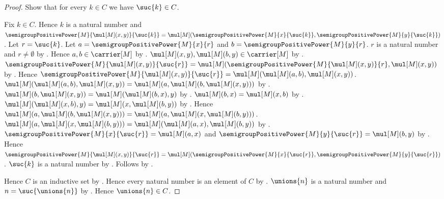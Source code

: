 \begin{proof}
    Show that for every $k\in C$ we have $\suc{k}\in C$.
    \begin{subproof}
        Fix $k\in C$.
        Hence $k$ is a natural number and
            $\semigroupPositivePower{M}{\mul[M](x,y)}{\suc{k}}
                =\mul[M](\semigroupPositivePower{M}{x}{\suc{k}},
                    \semigroupPositivePower{M}{y}{\suc{k}})$.
        Let $r=\suc{k}$.
        Let $a=\semigroupPositivePower{M}{x}{r}$ and
            $b=\semigroupPositivePower{M}{y}{r}$.
        $r$ is a natural number and $r\neq\emptyset$ by
            .
        Hence $a,b\in\carrier[M]$ by
            .
        $\mul[M](x,y),\mul[M](b,y)\in\carrier[M]$ by
            .
        $\semigroupPositivePower{M}{\mul[M](x,y)}{\suc{r}}
            =\mul[M](
                \semigroupPositivePower{M}{\mul[M](x,y)}{r},
                \mul[M](x,y))$ by
            .
        Hence $\semigroupPositivePower{M}{\mul[M](x,y)}{\suc{r}}
            =\mul[M](\mul[M](a,b),\mul[M](x,y))$.
        $\mul[M](\mul[M](a,b),\mul[M](x,y))
            =\mul[M](a,\mul[M](b,\mul[M](x,y)))$ by
            .
        $\mul[M](b,\mul[M](x,y))
            =\mul[M](\mul[M](b,x),y)$ by
            .
        $\mul[M](b,x)=\mul[M](x,b)$ by \auto.
        $\mul[M](\mul[M](x,b),y)
            =\mul[M](x,\mul[M](b,y))$ by
            .
        Hence $\mul[M](a,\mul[M](b,\mul[M](x,y)))
            =\mul[M](a,\mul[M](x,\mul[M](b,y)))$.
        $\mul[M](a,\mul[M](x,\mul[M](b,y)))
            =\mul[M](\mul[M](a,x),\mul[M](b,y))$ by
            .
        $\semigroupPositivePower{M}{x}{\suc{r}}=\mul[M](a,x)$ and
            $\semigroupPositivePower{M}{y}{\suc{r}}=\mul[M](b,y)$ by
            .
        Hence
            $\semigroupPositivePower{M}{\mul[M](x,y)}{\suc{r}}
                =\mul[M](\semigroupPositivePower{M}{x}{\suc{r}},
                    \semigroupPositivePower{M}{y}{\suc{r}})$.
        $\suc{k}$ is a natural number by .
        Follows by \auto.
    \end{subproof}
    Hence $C$ is an inductive set by .
    Hence every natural number is an element of $C$ by
        .
    $\unions{n}$ is a natural number and
        $n=\suc{\unions{n}}$ by
        .
    Hence $\unions{n}\in C$.
\end{proof}
